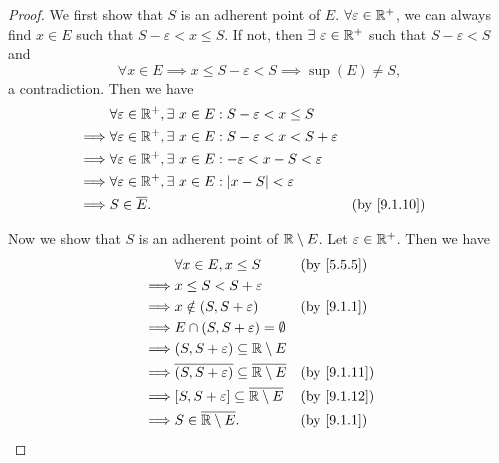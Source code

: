 \begin{proof}
  We first show that \(S\) is an adherent point of \(E\).
  \(\forall \varepsilon \in \mathbb{R}^+\), we can always find \(x \in E\) such that \(S - \varepsilon < x \leq S\).
  If not, then \(\exists\ \varepsilon \in \mathbb{R}^+\) such that \(S - \varepsilon < S\) and
  \[
    \forall x \in E \implies x \leq S - \varepsilon < S \implies \sup(E) \neq S,
  \]
  a contradiction.
  Then we have
  \begin{align*}
             & \forall \varepsilon \in \R^+, \exists\ x \in E : S - \varepsilon < x \leq S                                           \\
    \implies & \forall \varepsilon \in \R^+, \exists\ x \in E : S - \varepsilon < x < S + \varepsilon                                \\
    \implies & \forall \varepsilon \in \R^+, \exists\ x \in E : -\varepsilon < x - S < \varepsilon                                   \\
    \implies & \forall \varepsilon \in \R^+, \exists\ x \in E : \abs{x - S} < \varepsilon                                            \\
    \implies & S \in \overline{E}.                                                                    &  & \text{(by \cref{9.1.10})}
  \end{align*}

  Now we show that \(S\) is an adherent point of \(\mathbb{R} \setminus E\).
  Let \(\varepsilon \in \mathbb{R}^+\).
  Then we have
  \begin{align*}
             & \forall x \in E, x \leq S                                           &  & \text{(by \cref{5.5.5})}  \\
    \implies & x \leq S < S + \varepsilon                                                                         \\
    \implies & x \notin (S, S + \varepsilon)                                       &  & \text{(by \cref{9.1.1})}  \\
    \implies & E \cap (S, S + \varepsilon) = \emptyset                                                            \\
    \implies & (S, S + \varepsilon) \subseteq \R \setminus E                                                      \\
    \implies & \overline{(S, S + \varepsilon)} \subseteq \overline{\R \setminus E} &  & \text{(by \cref{9.1.11})} \\
    \implies & [S, S + \varepsilon] \subseteq \overline{\R \setminus E}            &  & \text{(by \cref{9.1.12})} \\
    \implies & S \in \overline{\R \setminus E}.                                    &  & \text{(by \cref{9.1.1})}
  \end{align*}
\end{proof}